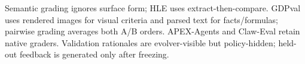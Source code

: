 Semantic grading ignores surface form; HLE uses extract-then-compare.  GDPval
uses rendered images for visual criteria and parsed text for facts/formulas;
pairwise grading averages both A/B orders.  APEX-Agents and Claw-Eval retain
native graders.  Validation rationales are evolver-visible but policy-hidden;
held-out feedback is generated only after freezing.
